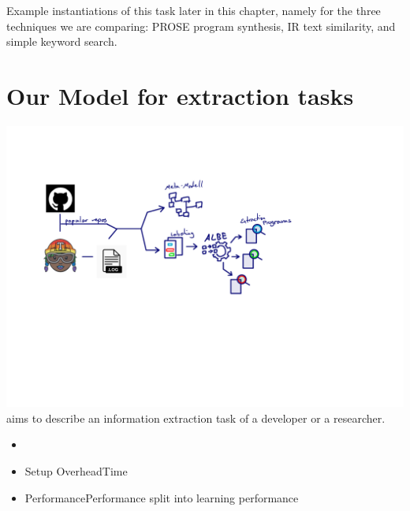 \documentclass[\myrootdir/main.tex]{subfiles}
\begin{document}
Example instantiations of this task later in this chapter, namely for the three techniques we are comparing: PROSE program synthesis, IR text similarity, and simple keyword search. 

\section{Our Model for extraction tasks}
\includegraphics[page=4, width=\textwidth, trim={0.5cm 0.5cm 0.5cm 0.5cm}, clip]{img/flow-of-research.pdf}
aims to describe an information extraction task of a developer or a researcher.
\begin{itemize}
  \item {}
  \item{Setup Overhead}{Time}
  \item{Performance}{Performance} split into learning performance
\end{itemize}
\end{document}

